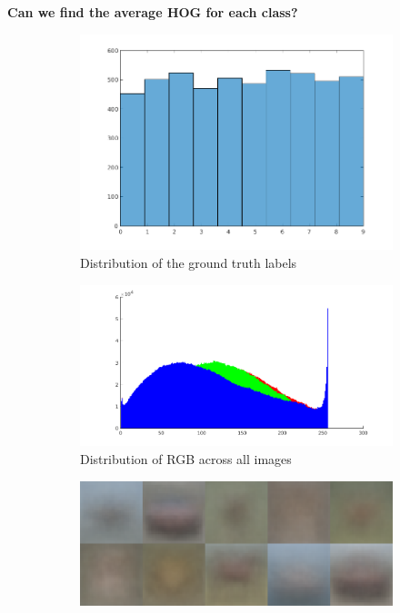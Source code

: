 \documentclass{article} %
\begin{document}
    \textbf{Can we find the average HOG for each class?}
    \begin{figure}[h]
        \centering
        \begin{subfigure}{.2\linewidth}
            \centering
            \includegraphics[width=.75\linewidth]{label-distribution.png}
        \caption{Distribution of the ground truth labels}
        \end{subfigure}
        \begin{subfigure}{.2\linewidth}
            \centering
            \includegraphics[width=\linewidth]{hist-overall.png}
        \caption{Distribution of RGB across all images}
        \end{subfigure}
        \begin{subfigure}{.2\linewidth}
            \centering
            \includegraphics[width=\linewidth]{avg-img.png}

\end{subfigure}
\end{figure}
\end{document}
